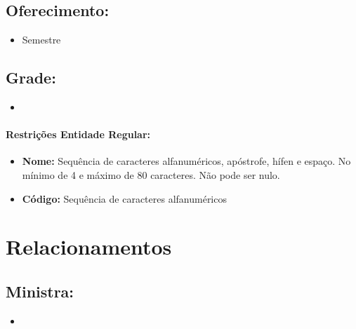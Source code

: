 \documentclass{report}
\begin{document}
\subsection{Oferecimento:}
\begin{itemize}
  \item Semestre
\end{itemize}

\subsection{Grade:}
\begin{itemize}
  \item
\end{itemize}
\paragraph{Restrições Entidade Regular:}
\begin{itemize}
  \item \textbf{Nome:} Sequência de caracteres alfanuméricos, apóstrofe, hífen e espaço. No mínimo de 4 e máximo de 80 caracteres. Não pode ser nulo.
  \item \textbf{Código:} Sequência de caracteres alfanuméricos
\end{itemize}
\section{Relacionamentos}

\subsection{Ministra:}
\begin{itemize}
  \item
\end{itemize}
\end{document}
